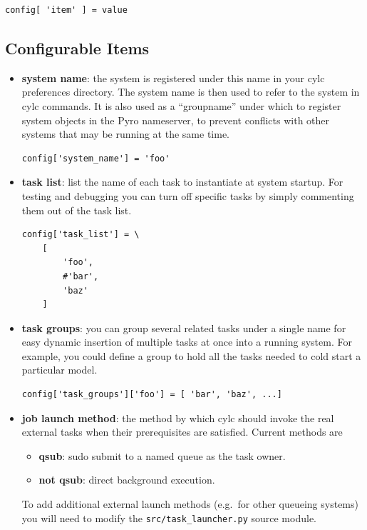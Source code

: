 \documentclass[11pt,a4paper]{article}
\begin{document}
\lstset{language=Python}
\begin{lstlisting}
config[ 'item' ] = value
\end{lstlisting}

\subsection{Configurable Items}

\begin{itemize} \item {\bf system name}: the system is registered under
        this name in your cylc preferences directory. The system name is
        then used to refer to the system in cylc commands. It is also
        used as a ``groupname'' under which to register system objects 
        in the Pyro nameserver, to prevent conflicts with other systems
        that may be running at the same time.

        \begin{lstlisting}
config['system_name'] = 'foo'
        \end{lstlisting}

    \item {\bf task list}: list the name of each task to instantiate at
        system startup.  For testing and debugging you can turn off
        specific tasks by simply commenting them out of the task list.
        
        \begin{lstlisting}
config['task_list'] = \
    [
        'foo',
        #'bar',
        'baz'
    ]
        \end{lstlisting}


    \item {\bf task groups}: you can group several related tasks under a
        single name for easy dynamic insertion of multiple tasks at
        once into a running system. For example, you could define a 
        group to hold all the tasks needed to cold start a particular
        model.

        \begin{lstlisting}
config['task_groups']['foo'] = [ 'bar', 'baz', ...]
        \end{lstlisting}

    \item {\bf job launch method}: the method by which cylc should
        invoke the real external tasks when their prerequisites are
        satisfied. Current methods are
        \begin{itemize}
            \item {\bf qsub}: sudo submit to a named queue as the task
                owner.  
            \item {\bf not qsub}: direct background execution.
        \end{itemize}
        To add additional external launch methods (e.g.\ for other
        queueing systems) you will need to modify the 
        \lstinline{src/task_launcher.py} source module.


\end{itemize}
\end{document}
